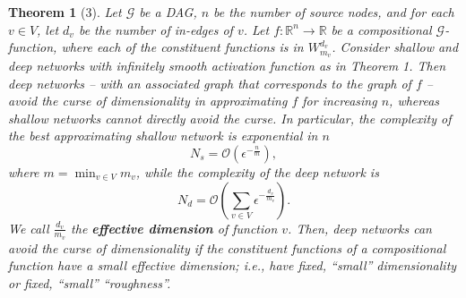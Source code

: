 \documentclass[11pt,a4paper]{article}
\theoremstyle{plain}
\newtheorem{theorem}{Theorem}[section]
\theoremstyle{definition}
\theoremstyle{remark}
\begin{document}
\begin{theorem}[3]
    Let $\mathcal{G}$ be a DAG, $n$ be the number of source nodes, and for each $v \in V$, let $d_v$ be the number of in-edges of $v$. Let $f : \mathbb{R}^n \to \mathbb{R}$ be a compositional $\mathcal{G}$-function, where each of the constituent functions is in $W_{m_{v}}^{d_{v}}$. Consider shallow and deep networks with infinitely smooth activation function as in Theorem 1. Then deep networks – with an associated graph that corresponds to the graph of $f$ – avoid the curse of dimensionality in approximating $f$ for increasing $n$, whereas shallow networks cannot directly avoid the curse. In particular, the complexity of the best approximating shallow network is exponential in $n$
    \[
        N_s = \mathcal{O}\left(\epsilon^{-\frac{n}{m}}\right),
    \]
    where $m = \min_{v \in V} m_v$, while the complexity of the deep network is
    \[
        N_d = \mathcal{O}\left(\sum_{v \in V} \epsilon^{-\frac{d_v}{m_v}}\right).
    \]
    We call $\frac{d_v}{m_v}$ the \textbf{effective dimension} of function $v$. Then, deep networks can avoid the curse of dimensionality if the constituent functions of a compositional function have a small effective dimension; i.e., have fixed, “small” dimensionality or fixed, “small” “roughness”.
\end{theorem}
\end{document}
